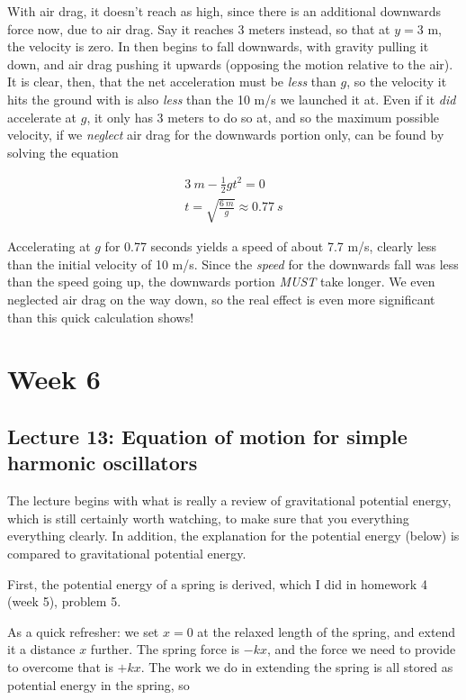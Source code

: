 \documentclass[12pt,a4paper]{report}
\begin{document}
With air drag, it doesn't reach as high, since there is an additional downwards force now, due to air drag. Say it reaches 3 meters instead, so that at $y = 3$ m, the velocity is zero. In then begins to fall downwards, with gravity pulling it down, and air drag pushing it upwards (opposing the motion relative to the air). It is clear, then, that the net acceleration must be \emph{less} than $g$, so the velocity it hits the ground with is also \emph{less} than the 10 m/s we launched it at. Even if it \emph{did} accelerate at $g$, it only has 3 meters to do so at, and so the maximum possible velocity, if we \emph{neglect} air drag for the downwards portion only, can be found by solving the equation

\begin{align}
\SI{3}{m} - \frac{1}{2} g t^2 = 0\\
t = \sqrt{\frac{\SI{6}{m}}{g}} \approx \SI{0.77}{s}
\end{align}

Accelerating at $g$ for 0.77 seconds yields a speed of about 7.7 m/s, clearly less than the initial velocity of 10 m/s. Since the \emph{speed} for the downwards fall was less than the speed going up, the downwards portion \emph{MUST} take longer. We even neglected air drag on the way down, so the real effect is even more significant than this quick calculation shows!

\chapter{Week 6}

\section{Lecture 13: Equation of motion for simple harmonic oscillators}

The lecture begins with what is really a review of gravitational potential energy, which is still certainly worth watching, to make sure that you everything everything clearly. In addition, the explanation for the potential energy (below) is compared to gravitational potential energy.

First, the potential energy of a spring is derived, which I did in homework 4 (week 5), problem 5.

As a quick refresher: we set $x = 0$ at the relaxed length of the spring, and extend it a distance $x$ further. The spring force is $-k x$, and the force we need to provide to overcome that is $+ k x$. The work we do in extending the spring is all stored as potential energy in the spring, so
\end{document}
